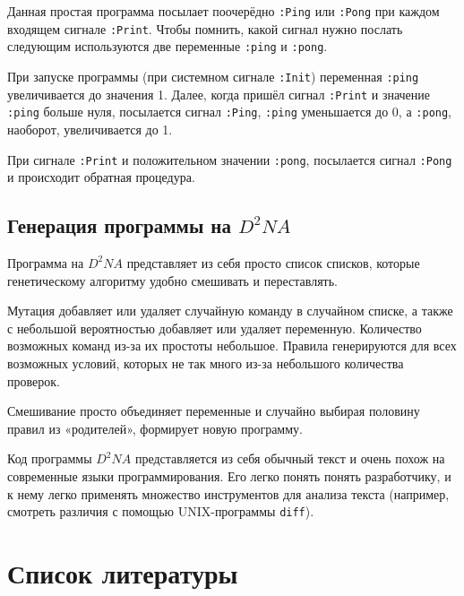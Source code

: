 \documentclass[a4paper,14pt]{extarticle}
\begin{document}
Данная простая программа посылает поочерёдно \texttt{:Ping} или \texttt{:Pong}
при каждом входящем сигнале \texttt{:Print}. Чтобы помнить, какой сигнал нужно
послать следующим используются две переменные \texttt{:ping} и \texttt{:pong}.

При запуске программы (при системном сигнале \texttt{:Init}) переменная
\texttt{:ping} увеличивается до значения 1. Далее, когда пришёл сигнал
\texttt{:Print} и значение \texttt{:ping} больше нуля, посылается сигнал
\texttt{:Ping}, \texttt{:ping} уменьшается до 0, а \texttt{:pong}, наоборот,
увеличивается до 1.

При сигнале \texttt{:Print} и положительном значении \texttt{:pong}, посылается
сигнал \texttt{:Pong} и происходит обратная процедура.

\subsection{Генерация программы на $D^2NA$}
Программа на $D^2NA$ представляет из себя просто список списков, которые
генетическому алгоритму удобно смешивать и переставлять.

Мутация добавляет или удаляет случайную команду в случайном списке, а также с
небольшой вероятностью добавляет или удаляет переменную. Количество возможных
команд из-за их простоты небольшое. Правила генерируются для всех возможных
условий, которых не так много из-за небольшого количества проверок.

Смешивание просто объединяет переменные и случайно выбирая половину правил из
«родителей», формирует новую программу.

Код программы $D^2NA$ представляется из себя обычный текст и очень похож на
современные языки программирования. Его легко понять понять разработчику,
и к нему легко применять множество инструментов для анализа текста (например,
смотреть различия с помощью UNIX-программы \texttt{diff}).

\newpage
\section{Список литературы}
\end{document}
